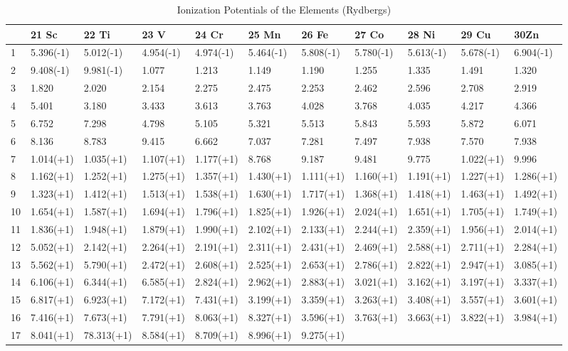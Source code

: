\begin{table}
\scriptsize
\caption{Ionization Potentials of the Elements (Rydbergs)}
\begin{tabular}{lllllllllll}
\hline
& 21 Sc& 22 Ti& 23 V& 24 Cr& 25 Mn& 26 Fe& 27 Co& 28 Ni& 29 Cu& 30Zn\\
\hline
1& 5.396(-1)& 5.012(-1)& 4.954(-1)& 4.974(-1)& 5.464(-1)& 5.808(-1)&
5.780(-1)& 5.613(-1)& 5.678(-1)& 6.904(-1)\\
2& 9.408(-1)& 9.981(-1)& 1.077& 1.213& 1.149& 1.190& 1.255& 1.335& 1.491&
1.320\\
3& 1.820& 2.020& 2.154& 2.275& 2.475& 2.253& 2.462& 2.596& 2.708& 2.919\\
4& 5.401& 3.180& 3.433& 3.613& 3.763& 4.028& 3.768& 4.035& 4.217& 4.366\\
5& 6.752& 7.298& 4.798& 5.105& 5.321& 5.513& 5.843& 5.593& 5.872& 6.071\\
6& 8.136& 8.783& 9.415& 6.662& 7.037& 7.281& 7.497& 7.938& 7.570& 7.938\\
7& 1.014(+1)& 1.035(+1)& 1.107(+1)& 1.177(+1)& 8.768& 9.187& 9.481& 9.775&
1.022(+1)& 9.996\\
8& 1.162(+1)& 1.252(+1)& 1.275(+1)& 1.357(+1)& 1.430(+1)& 1.111(+1)&
1.160(+1)& 1.191(+1)& 1.227(+1)& 1.286(+1)\\
9& 1.323(+1)& 1.412(+1)& 1.513(+1)& 1.538(+1)& 1.630(+1)& 1.717(+1)&
1.368(+1)& 1.418(+1)& 1.463(+1)& 1.492(+1)\\
10& 1.654(+1)& 1.587(+1)& 1.694(+1)& 1.796(+1)& 1.825(+1)& 1.926(+1)&
2.024(+1)& 1.651(+1)& 1.705(+1)& 1.749(+1)\\
11& 1.836(+1)& 1.948(+1)& 1.879(+1)& 1.990(+1)& 2.102(+1)& 2.133(+1)&
2.244(+1)& 2.359(+1)& 1.956(+1)& 2.014(+1)\\
 12&5.052(+1)& 2.142(+1)&
2.264(+1)& 2.191(+1)& 2.311(+1)& 2.431(+1)& 2.469(+1)& 2.588(+1)& 2.711(+1)&
2.284(+1)\\
13& 5.562(+1)& 5.790(+1)& 2.472(+1)& 2.608(+1)& 2.525(+1)& 2.653(+1)&
2.786(+1)& 2.822(+1)& 2.947(+1)& 3.085(+1)\\
14& 6.106(+1)& 6.344(+1)&
6.585(+1)& 2.824(+1)& 2.962(+1)& 2.883(+1)& 3.021(+1)& 3.162(+1)& 3.197(+1)&
3.337(+1)\\
15& 6.817(+1)& 6.923(+1)& 7.172(+1)& 7.431(+1)& 3.199(+1)& 3.359(+1)&
3.263(+1)& 3.408(+1)& 3.557(+1)& 3.601(+1)\\
16& 7.416(+1)& 7.673(+1)& 7.791(+1)& 8.063(+1)& 8.327(+1)& 3.596(+1)&
3.763(+1)& 3.663(+1)& 3.822(+1)& 3.984(+1)\\
17& 8.041(+1)& 78.313(+1)& 8.584(+1)& 8.709(+1)& 8.996(+1)& 9.275(+1)&

\end{tabular}
\end{table}
